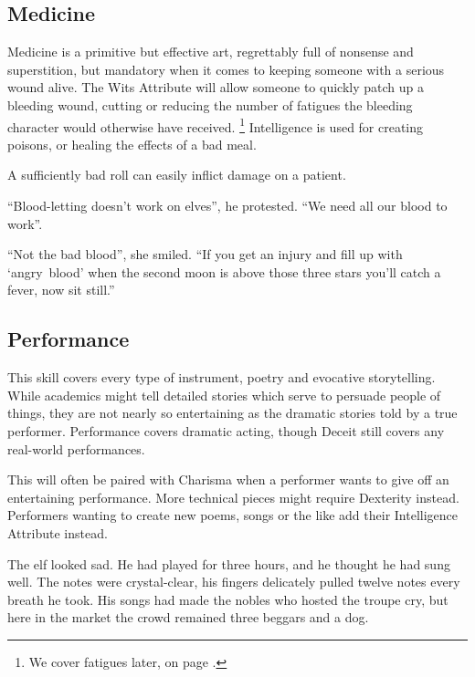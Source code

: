 \begin{multicols}{2}
\subsection{Medicine}

Medicine is a primitive but effective art, regrettably full of nonsense and superstition, but mandatory when it comes to keeping someone with a serious wound alive.
The Wits Attribute will allow someone to quickly patch up a bleeding wound, cutting or reducing the number of \glspl{fatigue} the bleeding character would otherwise have received.%
\footnote{We cover \glspl{fatigue} later, on page \pageref{fatigue}.}
Intelligence is used for creating poisons, or healing the effects of a bad meal.

A sufficiently bad roll can easily inflict damage on a patient.

\begin{exampletext}
  ``Blood-letting doesn't work on elves'', he protested.
  ``We need all our blood to work''.

  ``Not the bad blood'', she smiled.
  ``If you get an injury and fill up with `angry~blood' when the second moon is above those three stars you'll catch a fever, now sit still.''
\end{exampletext}

\subsection{Performance}

This skill covers every type of instrument, poetry and evocative storytelling. While academics might tell detailed stories which serve to persuade people of things, they are not nearly so entertaining as the dramatic stories told by a true performer. Performance covers dramatic acting, though Deceit still covers any real-world performances.

This will often be paired with Charisma when a performer wants to give off an entertaining performance. More technical pieces might require Dexterity instead. Performers wanting to create new poems, songs or the like add their Intelligence Attribute instead.

\begin{exampletext}
  The elf looked sad.
  He had played for three hours, and he thought he had sung well.
  The notes were crystal-clear, his fingers delicately pulled twelve notes every breath he took.
  His songs had made the nobles who hosted the troupe cry, but here in the market the crowd remained three beggars and a dog.


\end{exampletext}
\end{multicols}
